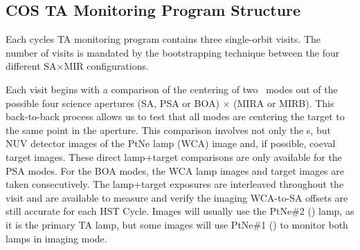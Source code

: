 \subsection{COS TA Monitoring Program Structure}\label{subsec:structure}

Each cycles TA monitoring program contains three single-orbit visits. The number of visits is mandated by the bootstrapping technique between the four different  SA$\times$MIR configurations.

Each visit begins with a comparison of the centering of two ~modes out of the possible four science apertures (SA, PSA or BOA) $\times$ (MIRA or MIRB).
This back-to-back process allows us to test that all  modes are centering the target to the same point in the aperture.
This comparison involves not only the s, but NUV detector images of the PtNe lamp (WCA) image and, if possible, coeval target images.
These direct lamp+target comparisons are only available for the PSA modes. For the BOA modes, the WCA lamp images and target images are taken consecutively.
The lamp+target exposures are interleaved throughout the visit and are available to measure and verify the imaging WCA-to-SA offsets are still accurate for each HST Cycle.
Images will usually use the PtNe\#2 (\plamptwo{}) lamp, as it is the primary TA lamp, but some images will use PtNe\#1 (\plampone{}) to monitor both lamps in imaging mode.

